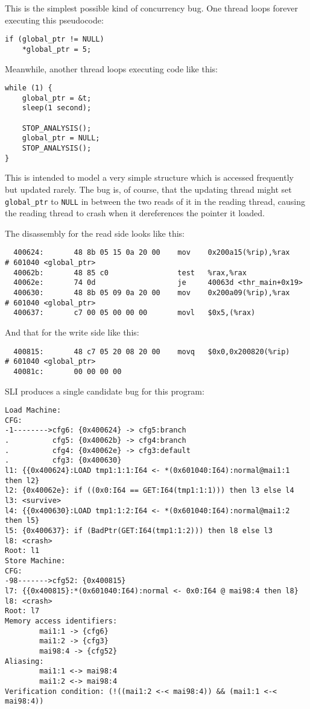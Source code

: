 This is the simplest possible kind of concurrency bug.  One thread
loops forever executing this pseudocode:

\begin{verbatim}
if (global_ptr != NULL)
    *global_ptr = 5;
\end{verbatim}

Meanwhile, another thread loops executing code like this:

\begin{verbatim}
while (1) {
    global_ptr = &t;
    sleep(1 second);

    STOP_ANALYSIS();
    global_ptr = NULL;
    STOP_ANALYSIS();
}
\end{verbatim}

This is intended to model a very simple structure which is accessed
frequently but updated rarely.  The bug is, of course, that the
updating thread might set \verb|global_ptr| to \verb|NULL| in between
the two reads of it in the reading thread, causing the reading thread
to crash when it dereferences the pointer it loaded.

The disassembly for the read side looks like this:

\begin{verbatim}
  400624:       48 8b 05 15 0a 20 00    mov    0x200a15(%rip),%rax        # 601040 <global_ptr>
  40062b:       48 85 c0                test   %rax,%rax
  40062e:       74 0d                   je     40063d <thr_main+0x19>
  400630:       48 8b 05 09 0a 20 00    mov    0x200a09(%rip),%rax        # 601040 <global_ptr>
  400637:       c7 00 05 00 00 00       movl   $0x5,(%rax)
\end{verbatim}

And that for the write side like this:

\begin{verbatim}
  400815:       48 c7 05 20 08 20 00    movq   $0x0,0x200820(%rip)        # 601040 <global_ptr>
  40081c:       00 00 00 00 
\end{verbatim}

SLI produces a single candidate bug for this program:

\begin{verbatim}
Load Machine:
CFG:
-1-------->cfg6: {0x400624} -> cfg5:branch
.          cfg5: {0x40062b} -> cfg4:branch
.          cfg4: {0x40062e} -> cfg3:default
.          cfg3: {0x400630}
l1: {{0x400624}:LOAD tmp1:1:1:I64 <- *(0x601040:I64):normal@mai1:1 then l2}
l2: {0x40062e}: if ((0x0:I64 == GET:I64(tmp1:1:1))) then l3 else l4
l3: <survive>
l4: {{0x400630}:LOAD tmp1:1:2:I64 <- *(0x601040:I64):normal@mai1:2 then l5}
l5: {0x400637}: if (BadPtr(GET:I64(tmp1:1:2))) then l8 else l3
l8: <crash>
Root: l1
Store Machine:
CFG:
-98------->cfg52: {0x400815}
l7: {{0x400815}:*(0x601040:I64):normal <- 0x0:I64 @ mai98:4 then l8}
l8: <crash>
Root: l7
Memory access identifiers:
        mai1:1 -> {cfg6}
        mai1:2 -> {cfg3}
        mai98:4 -> {cfg52}
Aliasing:
        mai1:1 <-> mai98:4
        mai1:2 <-> mai98:4
Verification condition: (!((mai1:2 <-< mai98:4)) && (mai1:1 <-< mai98:4))
\end{verbatim}

